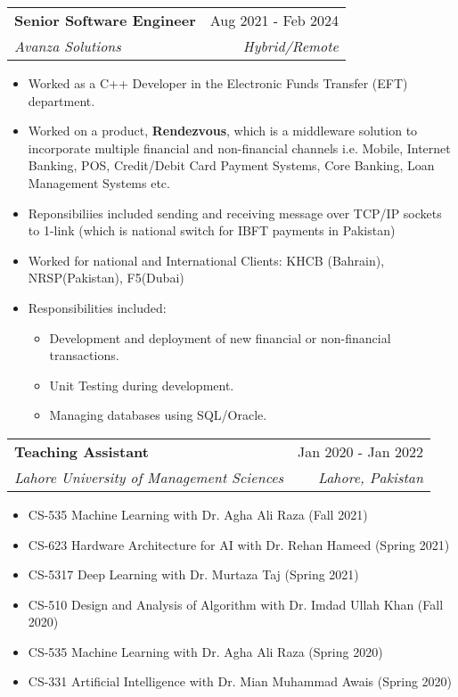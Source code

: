 \documentclass[letterpaper,11pt]{article}
\makeatletter
\newcommand{\resumeItem}[1]{
  \item\small{
    {#1 \vspace{-2pt}}
  }
}
\newcommand{\resumeSubheading}[4]{
  \vspace{-2pt}\item
    \begin{tabular*}{0.97\textwidth}[t]{l@{\extracolsep{\fill}}r}
      \textbf{#1} & #2 \\
      \textit{\small#3} & \textit{\small #4} \\
    \end{tabular*}\vspace{-7pt}
}
\newcommand{\resumeItemListStart}{\begin{itemize}}
\newcommand{\resumeItemListEnd}{\end{itemize}\vspace{-5pt}}
\makeatother
\begin{document}
%        


    \resumeSubheading
      {Senior Software Engineer}{Aug 2021 - Feb 2024}
      {Avanza Solutions}{Hybrid/Remote}
      \resumeItemListStart
        \resumeItem{Worked as a C++ Developer in the Electronic Funds Transfer (EFT) department.}
        \resumeItem{Worked on a product, \textbf{Rendezvous}, which is a middleware solution to incorporate multiple financial and non-financial channels i.e. Mobile, Internet Banking, POS, Credit/Debit Card Payment Systems, Core Banking, Loan Management Systems etc.}
        \resumeItem{Reponsibiliies included sending and receiving message over TCP/IP sockets to 1-link (which is national switch for IBFT payments in Pakistan)}
        \resumeItem{Worked for national and International Clients: KHCB (Bahrain), NRSP(Pakistan), F5(Dubai)}
        \resumeItem{Responsibilities included:
            \resumeItemListStart
        			\resumeItem{Development and deployment of new financial or non-financial transactions.}
        			\resumeItem{Unit Testing during development.}
        			\resumeItem{Managing databases using SQL/Oracle.}
   			\resumeItemListEnd}
    \resumeItemListEnd
      
    \resumeSubheading
      {Teaching Assistant}{Jan 2020 - Jan 2022}
      {Lahore University of Management Sciences}{Lahore, Pakistan}
      \vspace{0.1cm}
      
      \resumeItemListStart
      During my 2 year of MS at LUMS, I worked as a TA for 5 graduate level courses and 1 undergraduate course. For these courses I designed and graded assignments/quizzes and also conducted tutorial sessions. The courses are:
        \resumeItem{CS-535 Machine Learning with Dr. Agha Ali Raza (Fall 2021)}
        \resumeItem{CS-623 Hardware Architecture for AI with Dr. Rehan Hameed (Spring 2021)}
        \resumeItem{CS-5317 Deep Learning with Dr. Murtaza Taj (Spring 2021)}
        \resumeItem{CS-510 Design and Analysis of Algorithm with Dr. Imdad Ullah Khan (Fall 2020)}
        \resumeItem{CS-535 Machine Learning with Dr. Agha Ali Raza (Spring 2020)}
        \resumeItem{CS-331 Artificial Intelligence with Dr. Mian Muhammad Awais (Spring 2020)}        
     \resumeItemListEnd      
      
\end{document}
